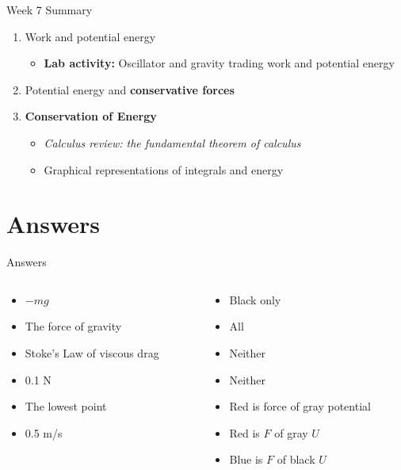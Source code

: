 \documentclass{beamer}
\begin{document}
\begin{frame}{Week 7 Summary}
\begin{enumerate}
\item \alert{Work} and \alert{potential energy}
\begin{itemize}
\item \textbf{Lab activity:} Oscillator and gravity trading work and potential energy
\end{itemize}
\item Potential energy and \textbf{conservative forces}
\item \alert{\textbf{Conservation of Energy}}
\begin{itemize}
\item \textit{Calculus review: the fundamental theorem of calculus}
\item Graphical representations of integrals and energy
\end{itemize}
\end{enumerate}
\end{frame}

\section{Answers}

\begin{frame}{Answers}
\begin{columns}[T]
\begin{column}{0.5\textwidth}
\begin{itemize}
\item $-mg$
\item The force of gravity
\item Stoke's Law of viscous drag
\item 0.1 N
\item The lowest point
\item 0.5 m/s
\end{itemize}
\end{column}
\begin{column}{0.5\textwidth}
\begin{itemize}
\item Black only
\item All
\item Neither
\item Neither
\item Red is force of gray potential
\item Red is $F$ of gray $U$
\item Blue is $F$ of black $U$
\end{itemize}
\end{column}
\end{columns}
\end{frame}
\end{document}
